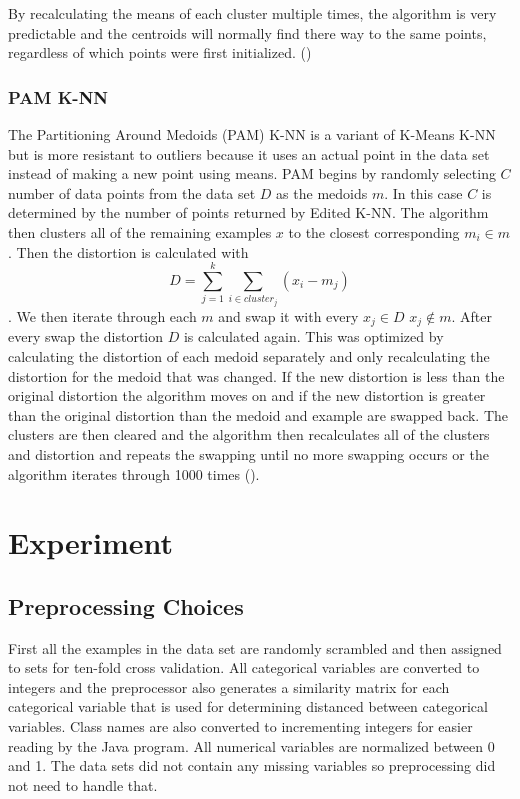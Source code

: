 \documentclass[twoside,11pt]{article}
\begin{document}
By recalculating the means of each cluster multiple times, the algorithm is very predictable and the centroids will normally find there way to the same points, regardless of which points were first initialized. (\cite{CMeans})

\subsubsection{PAM K-NN}
The Partitioning Around Medoids (PAM) K-NN is a variant of K-Means K-NN but is more resistant to outliers because it uses an actual point in the data set instead of making a new point using means. PAM begins by randomly selecting $C$ number of data points from the data set $D$ as the medoids $m$. In this case $C$ is determined by the number of points returned by Edited K-NN. The algorithm then clusters all of the remaining examples $x$ to the closest corresponding $m_i \in m$. Then the distortion is calculated with $$D = \sum_{j=1}^{k}\sum_{i \in cluster_j} (x_i - m_j)$$. We then iterate through each $m$ and swap it with every $x_j \in D$ $x_j \notin m$. After every swap the distortion $D$ is calculated again. This was optimized by calculating the distortion of each medoid separately and only recalculating the distortion for the medoid that was changed. If the new distortion is less than the original distortion the algorithm moves on and if the new distortion is greater than the original distortion than the medoid and example are swapped back. The clusters are then cleared and the algorithm then recalculates all of the clusters and distortion and repeats the swapping until no more swapping occurs or the algorithm iterates through 1000 times (\cite{Fox1990FindingGI}).

\section{Experiment}

\subsection{Preprocessing Choices}

First all the examples in the data set are randomly scrambled and then assigned to sets for ten-fold cross validation. All categorical variables are converted to integers and the preprocessor also generates a similarity matrix for each categorical variable that is used for determining distanced between categorical variables. Class names are also converted to incrementing integers for easier reading by the Java program. All numerical variables are normalized between 0 and 1. The data sets did not contain any missing variables so preprocessing did not need to handle that.
\end{document}

